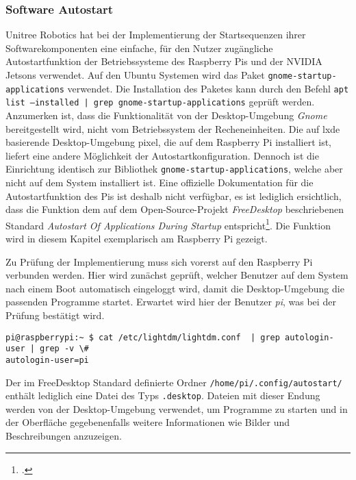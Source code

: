 \subsubsection{Software Autostart}
\label{subsubsec:software-autostart}

Unitree Robotics hat bei der Implementierung der Startsequenzen ihrer Softwarekomponenten eine einfache, für den Nutzer
zugängliche Autostartfunktion der Betriebssysteme des Raspberry Pis und der NVIDIA Jetsons verwendet.
Auf den Ubuntu Systemen wird das Paket \texttt{gnome\allowbreak -start\-up-\allowbreak app\-li\-cations} verwendet.
Die Installation des Paketes kann durch den Befehl \texttt{apt list --installed | grep gnome-\allowbreak start\-up-\allowbreak app\-li\-cations}
geprüft werden.
Anzumerken ist, dass die Funktionalität von der Desktop-Umgebung \emph{Gnome} bereitgestellt wird, nicht vom Betriebssystem
der Recheneinheiten.
Die auf \gls{lxde} basierende Desktop-Umgebung \gls{pixel}, die auf dem Raspberry Pi installiert ist, liefert eine andere
Möglichkeit der Autostartkonfiguration.
Dennoch ist die Einrichtung identisch zur Bibliothek \texttt{gnome-\allowbreak start\-up-\allowbreak app\-li\-cations}, welche aber nicht auf dem System
installiert ist.
Eine offizielle Dokumentation für die Autostartfunktion des Pis ist deshalb nicht verfügbar, es ist lediglich ersichtlich,
dass die Funktion dem auf dem Open-Source-Projekt \emph{FreeDesktop} beschriebenen Standard \emph{Autostart Of Applications During Startup}
entspricht\footcite{freedesktop_autostart}.
Die Funktion wird in diesem Kapitel exemplarisch am Raspberry Pi gezeigt.


Zu Prüfung der Implementierung muss sich vorerst auf den Raspberry Pi verbunden werden.
Hier wird zunächst geprüft, welcher Benutzer auf dem System nach einem Boot automatisch eingeloggt wird, damit die
Desktop-Umgebung die passenden Programme startet.
Erwartet wird hier der Benutzer \emph{pi}, was bei der Prüfung bestätigt wird.

\begin{lstlisting}
pi@raspberrypi:~ $ cat /etc/lightdm/lightdm.conf  | grep autologin-user | grep -v \#
autologin-user=pi
\end{lstlisting}

\noindent Der im FreeDesktop Standard definierte Ordner \texttt{/home/\allowbreak pi/\allowbreak .config/\allowbreak autostart/} enthält lediglich eine Datei des Typs
\texttt{.desktop}.
Dateien mit dieser Endung werden von der Desktop-Umgebung verwendet, um Programme zu starten und in der Oberfläche
gegebenenfalls weitere Informationen wie Bilder und Beschreibungen anzuzeigen.

